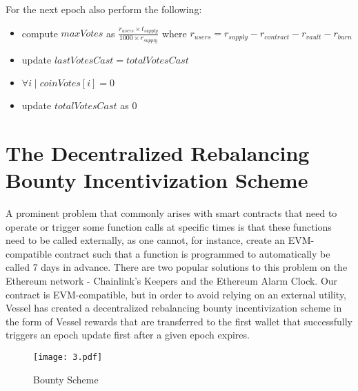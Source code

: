 \documentclass[letterpaper,11pt]{article}
\begin{document}
\vspace{0.15cm}
\noindent For the next epoch also perform the following:

\begin{itemize}
\item compute $maxVotes$ as $\frac{r_{users} \times t_{supply}}{1000 \times r_{supply}}$
where $r_{users}=r_{supply}-r_{contract}-r_{vault}-r_{burn}$
\item update $lastVotesCast = totalVotesCast$
\item $\forall i \mid coinVotes[i]=0$
\item update $totalVotesCast$ as 0
\end{itemize}

\section{The Decentralized Rebalancing Bounty 
Incentivization Scheme}

A prominent problem that commonly arises with smart contracts that need to operate or trigger some function calls at specific times is that these functions need to be called externally, as one cannot, for instance, create an EVM-compatible contract such that a function is programmed to automatically be called 7 days in advance. There are two popular solutions to this problem on the Ethereum network - Chainlink’s Keepers and the Ethereum Alarm Clock. Our contract is EVM-compatible, but in order to avoid relying on an external utility, Vessel has created a decentralized rebalancing bounty incentivization scheme in the form of Vessel rewards that are transferred to the first wallet that successfully triggers an epoch update first after a given epoch expires.  \\
\begin{figure}[ht] 
        \centering \texttt{[image: 3.pdf]}
        \caption{\label{art_3}Bounty Scheme
        }
\end{figure}
\end{document}
